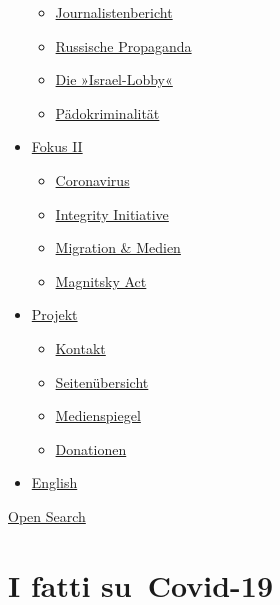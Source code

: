 \begin{itemize}
  \begin{itemize}
  \tightlist
  \item
    \href{https://swprs.org/bericht-eines-journalisten/}{Journalistenbericht}
  \item
    \href{https://swprs.org/russische-propaganda/}{Russische Propaganda}
  \item
    \href{https://swprs.org/die-israel-lobby-fakten-und-mythen/}{Die
    »Israel-Lobby«}
  \item
    \href{https://swprs.org/geopolitik-und-paedokriminalitaet/}{Pädokriminalität}
  \end{itemize}
\item
  \href{https://swprs.org/migration-und-medien/}{Fokus II}

  \begin{itemize}
  \tightlist
  \item
    \href{https://swprs.org/covid-19-hinweis-ii/}{Coronavirus}
  \item
    \href{https://swprs.org/die-integrity-initiative/}{Integrity
    Initiative}
  \item
    \href{https://swprs.org/migration-und-medien/}{Migration \& Medien}
  \item
    \href{https://swprs.org/der-fall-magnitsky/}{Magnitsky Act}
  \end{itemize}
\item
  \href{https://swprs.org/kontakt/}{Projekt}

  \begin{itemize}
  \tightlist
  \item
    \href{https://swprs.org/kontakt/}{Kontakt}
  \item
    \href{https://swprs.org/uebersicht/}{Seitenübersicht}
  \item
    \href{https://swprs.org/medienspiegel/}{Medienspiegel}
  \item
    \href{https://swprs.org/donationen/}{Donationen}
  \end{itemize}
\item
  \href{https://swprs.org/contact/}{English}
\end{itemize}

\protect\hyperlink{}{Open Search}

\hypertarget{i-fatti-su-covid-19}{%
\section{I fatti su~Covid-19}\label{i-fatti-su-covid-19}}

